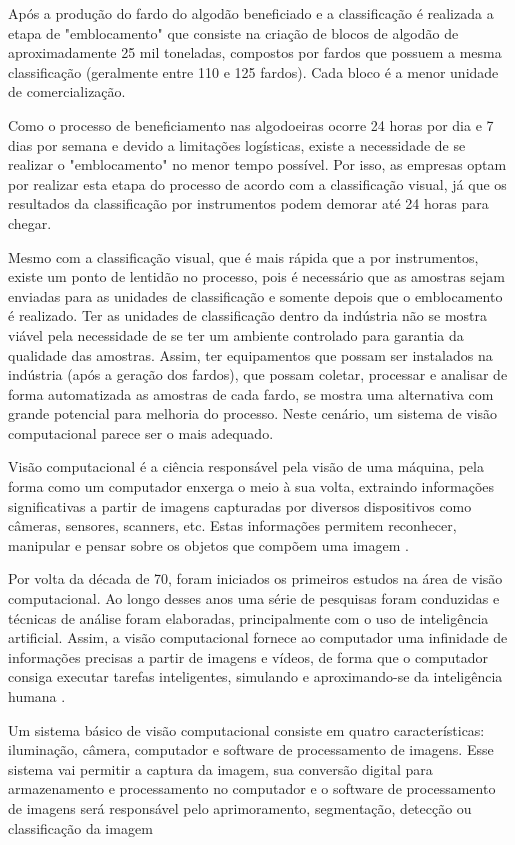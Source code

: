 Após a produção do fardo do algodão beneficiado e a classificação é realizada a etapa de "emblocamento"
que consiste na criação de blocos de algodão de aproximadamente 25 mil toneladas, compostos por fardos
que possuem a mesma classificação (geralmente entre 110 e 125 fardos). Cada bloco é a menor unidade
de comercialização.

Como o processo de beneficiamento nas algodoeiras ocorre 24 horas por dia e 7 dias por semana e devido
a limitações logísticas, existe a necessidade de se realizar o "emblocamento" no menor tempo possível.
Por isso, as empresas optam por realizar esta etapa do processo de acordo com a classificação visual, já
que os resultados da classificação por instrumentos podem demorar até 24 horas para chegar.

Mesmo com a classificação visual, que é mais rápida que a por instrumentos, existe um ponto de lentidão
no processo, pois é necessário que as amostras sejam enviadas para as unidades de classificação e
somente depois que o emblocamento é realizado. Ter as unidades de classificação dentro da indústria não
se mostra viável pela necessidade de se ter um ambiente controlado para garantia da qualidade das
amostras. Assim, ter equipamentos que possam ser instalados na indústria (após a geração dos fardos),
que possam coletar, processar e analisar de forma automatizada as amostras de cada fardo, se mostra uma
alternativa com grande potencial para melhoria do processo. Neste cenário, um sistema de visão
computacional parece ser o mais adequado.

Visão computacional é a ciência responsável pela visão de uma máquina, pela forma como um
computador enxerga o meio à sua volta, extraindo informações significativas a partir de imagens
capturadas por diversos dispositivos como câmeras, sensores, scanners, etc. Estas informações permitem
reconhecer, manipular e pensar sobre os objetos que compõem uma imagem \cite{ballard1982computer}.

Por volta da década de 70, foram iniciados os primeiros estudos na área de visão computacional. Ao longo
desses anos uma série de pesquisas foram conduzidas e técnicas de análise foram elaboradas,
principalmente com o uso de inteligência artificial. Assim, a visão computacional fornece ao computador
uma infinidade de informações precisas a partir de imagens e vídeos, de forma que o computador consiga
executar tarefas inteligentes, simulando e aproximando-se da inteligência humana \cite{oliveira2024visao}.

Um sistema básico de visão computacional consiste em quatro características: iluminação, câmera,
computador e software de processamento de imagens. Esse sistema vai permitir a captura da imagem, sua
conversão digital para armazenamento e processamento no computador e o software de processamento de
imagens será responsável pelo aprimoramento, segmentação, detecção ou classificação da imagem
\cite{zhang2014computer}

